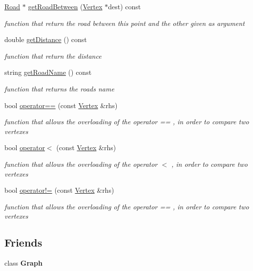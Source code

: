 \begin{DoxyCompactItemize}
\hyperlink{class_road}{Road} $\ast$ \hyperlink{class_vertex_a525c785bd79cd912c4734739bdda4e9d}{get\+Road\+Between} (\hyperlink{class_vertex}{Vertex} $\ast$dest) const 
\begin{DoxyCompactList}\small\item\em function that return the road between this point and the other given as argument \end{DoxyCompactList}\item 
double \hyperlink{class_vertex_a6bb81e47c596a1d08df08569664c01ad}{get\+Distance} () const 
\begin{DoxyCompactList}\small\item\em function that return the distance \end{DoxyCompactList}\item 
string \hyperlink{class_vertex_a82fdd355fdcd549c9f193fb141281246}{get\+Road\+Name} () const 
\begin{DoxyCompactList}\small\item\em function that returns the road\textquotesingle{}s name \end{DoxyCompactList}\item 
bool \hyperlink{class_vertex_a2b8c6de7599f56315c5f349351446005}{operator==} (const \hyperlink{class_vertex}{Vertex} \&rhs)
\begin{DoxyCompactList}\small\item\em function that allows the overloading of the operator == , in order to compare two vertexes \end{DoxyCompactList}\item 
bool \hyperlink{class_vertex_a666b9e590347fa9a3e10d468ae6d6836}{operator$<$} (const \hyperlink{class_vertex}{Vertex} \&rhs)
\begin{DoxyCompactList}\small\item\em function that allows the overloading of the operator $<$ , in order to compare two vertexes \end{DoxyCompactList}\item 
bool \hyperlink{class_vertex_a48a04c7e82a7902cd0c630e7ad3981c6}{operator!=} (const \hyperlink{class_vertex}{Vertex} \&rhs)
\begin{DoxyCompactList}\small\item\em function that allows the overloading of the operator == , in order to compare two vertexes \end{DoxyCompactList}\end{DoxyCompactItemize}
\subsection*{Friends}
\begin{DoxyCompactItemize}
\item 
class {\bfseries Graph}\hypertarget{class_vertex_afab89afd724f1b07b1aaad6bdc61c47a}{}\label{class_vertex_afab89afd724f1b07b1aaad6bdc61c47a}

\end{DoxyCompactItemize}


